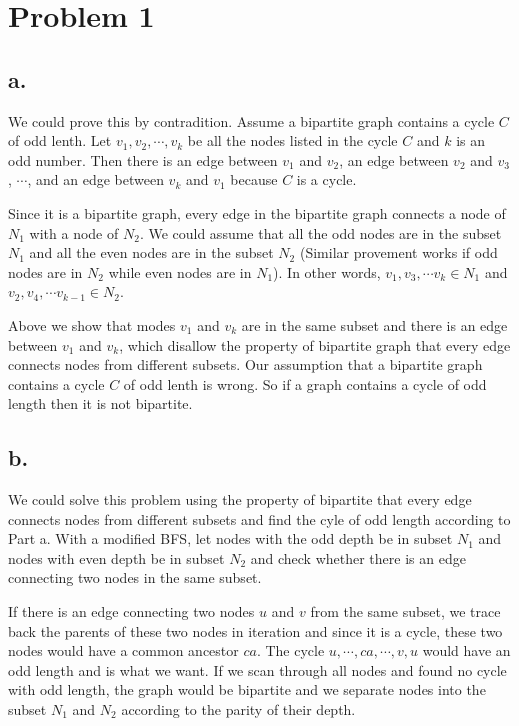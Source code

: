 \documentclass[twoside,11pt]{homework}
\begin{document}
\maketitle

\section*{Problem 1}
\subsection*{a.}
We could prove this by contradition.
Assume a bipartite graph contains a cycle $C$ of odd lenth.
Let $v_1, v_2, \cdots, v_k$ be all the nodes listed in the cycle $C$ and $k$ is an odd number.
Then there is an edge between $v_1$ and $v_2$, an edge between $v_2$ and $v_3$, $\cdots$, and an edge between $v_k$ and $v_1$ because $C$ is a cycle.

Since it is a bipartite graph, every edge in the bipartite graph connects a node of $N_1$ with a node of $N_2$.
We could assume that all the odd nodes are in the subset $N_1$ and all the even nodes are in the subset $N_2$ (Similar provement works if odd nodes are in $N_2$ while even nodes are in $N_1$).
In other words, $v_1, v_3, \cdots v_k \in N_1$ and $v_2, v_4, \cdots v_{k-1} \in N_2$.

Above we show that modes $v_1$ and $v_k$ are in the same subset and there is an edge between $v_1$ and $v_k$, which disallow the property of bipartite graph that every edge connects nodes from different subsets.
Our assumption that a bipartite graph contains a cycle $C$ of odd lenth is wrong.
So if a graph contains a cycle of odd length then it is not bipartite.

\subsection*{b.}
We could solve this problem using the property of  bipartite that every edge connects nodes from different subsets and find the cyle of odd length according to Part a.
With a modified BFS, let nodes with the odd depth be in subset $N_1$ and nodes with even depth  be in subset $N_2$ and check whether there is an edge connecting two nodes in the same subset.

If there is an edge connecting two nodes $u$ and $v$ from the same subset, we trace back the parents of these two nodes in iteration and since it is a cycle, these two nodes would have a common ancestor $ca$. 
The cycle $u, \cdots, ca, \cdots, v, u$ would have an odd length and is what we want.
If we scan through all nodes and found no cycle with odd length, the graph would be bipartite and we separate nodes into the subset $N_1$ and $N_2$ according to the parity of their depth.
\end{document}
